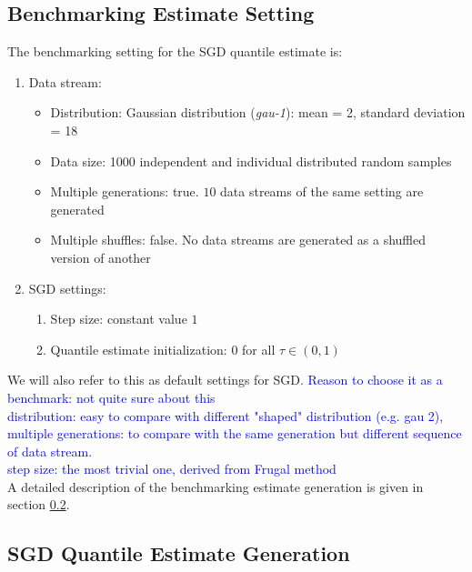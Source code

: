 \subsection{Benchmarking Estimate Setting}
The benchmarking setting for the SGD quantile estimate is:
    \begin{enumerate}
        \item Data stream:
            \begin{itemize}
                \item Distribution: Gaussian distribution (\textit{gau-1}): mean = 2, standard deviation = 18
                \item Data size: 1000 independent and individual distributed random samples
                \item Multiple generations: true. $10$ data streams of the same setting are generated
                \item Multiple shuffles: false. No data streams are generated as a shuffled version of another
            \end{itemize}
        \item SGD settings:
        \begin{enumerate}
            \item Step size: constant value $1$
            \item Quantile estimate initialization: $0$ for all $\tau \in (0,1)$
        \end{enumerate}
            
    \end{enumerate}
We will also refer to this as default settings for SGD.
\textcolor{blue}{
Reason to choose it as a benchmark: not quite sure about this
\\    
distribution: easy to compare with different "shaped" distribution (e.g. gau 2), 
\\
multiple generations: to compare with the same generation but different sequence of data stream. 
\\
step size: the most trivial one, derived from Frugal method}
\\
A detailed description of the benchmarking estimate generation is given in section \ref{subsec: exp_generation}.

\subsection{SGD Quantile Estimate Generation}
\label{subsec: exp_generation}

